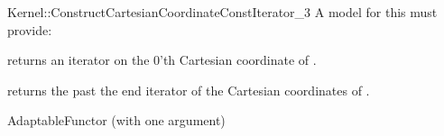 \begin{ccRefFunctionObjectConcept}{Kernel::ConstructCartesianCoordinateConstIterator_3}
A model for this must provide:



 {returns an iterator on the 0'th Cartesian coordinate of .}

 {returns the past the end iterator of the Cartesian coordinates of .}




\ccRefines
AdaptableFunctor (with one argument)


\ccSeeAlso
{} \\


\end{ccRefFunctionObjectConcept}
